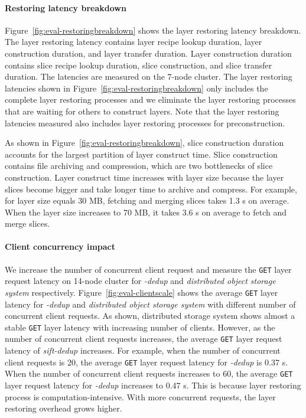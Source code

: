 \paragraph{Restoring latency breakdown}

Figure~\ref{fig:eval-restoringbreakdown} shows 
the layer restoring latency breakdown.
The layer restoring latency contains
layer recipe lookup duration,
layer construction duration, and layer transfer duration.
Layer construction duration
contains slice recipe lookup duration,
slice construction, and slice transfer duration.
%
The latencies are measured on the 7-node cluster.
The layer restoring latencies shown in Figure~\ref{fig:eval-restoringbreakdown}
only includes the complete layer restoring processes
and we eliminate the layer restoring processes that are waiting for
others to construct layers.
Note that the layer restoring latencies measured also includes
layer restoring processes for preconstruction.

As shown in Figure~\ref{fig:eval-restoringbreakdown},
slice construction duration accounts for the largest partition of  
layer construct time.
Slice construction contains
file archiving and compression, which are two bottlenecks of slice construction. 
Layer construct time increases with layer size because 
the layer slices become bigger and take longer time to archive and compress.
For example,
for layer size equals 30 MB,
fetching and merging slices takes 1.3 s on average.
When the layer size increases to 70 MB,
it takes 3.6 s on average to fetch and merge slices.

\paragraph{Client concurrency impact}
We increase the number of concurrent client request
and measure the \texttt{GET} layer request latency on 14-node cluster
for \emph{\sysname-dedup} and \emph{distributed object storage system} respectively.
%
Figure~\ref{fig:eval-clientscale} shows
the average \texttt{GET} layer latency for \emph{\sysname-dedup}
and \emph{distributed object storage system} with different number of concurrent client requests.
As shown, 
distributed storage system shows almost a stable \texttt{GET} layer latency with increasing number of clients.
However,
as the number of concurrent client requests increases,
the average \texttt{GET} layer request latency of \emph{sift-dedup} increases.
For example,
when the number of concurrent client requests is 20,
the average \texttt{GET} layer request latency for \emph{\sysname-dedup} is 0.37 s.
When the number of concurrent client requests increases to 60,
the average \texttt{GET} layer request latency for \emph{\sysname-dedup} increases to 0.47 s.
This is because layer restoring process is computation-intensive.
With more concurrent requests,
the layer restoring overhead grows higher.
